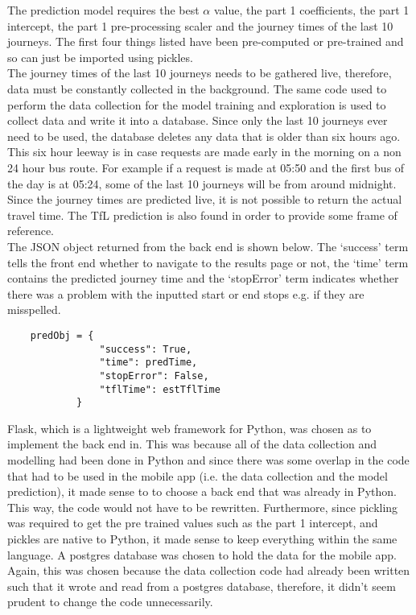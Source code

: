 The prediction model requires the best $\alpha$ value, the part 1 coefficients, the part 1 intercept, the part 1 pre-processing scaler and the journey times of the last 10 journeys. The first four things listed have been pre-computed or pre-trained and so can just be imported using pickles.\\ 

The journey times of the last 10 journeys needs to be gathered live, therefore, data must be constantly collected in the background. The same code used to perform the data collection for the model training and exploration is used to collect data and write it into a database. Since only the last 10 journeys ever need to be used, the database deletes any data that is older than six hours ago. This six hour leeway is in case requests are made early in the morning on a non 24 hour bus route. For example if a request is made at 05:50 and the first bus of the day is at 05:24, some of the last 10 journeys will be from around midnight. \\

Since the journey times are predicted live, it is not possible to return the actual travel time. The TfL prediction is also found in order to provide some frame of reference. \\

The JSON object returned from the back end is shown below. The `success' term tells the front end whether to navigate to the results page or not, the `time' term contains the predicted journey time and the `stopError' term indicates whether there was a problem with the inputted start or end stops e.g. if they are misspelled.

\begin{lstlisting}
    predObj = {
                "success": True,
                "time": predTime,
                "stopError": False,
                "tflTime": estTflTime
            }
\end{lstlisting}


Flask, which is a lightweight web framework for Python, was chosen as to implement the back end in. This was because all of the data collection and modelling had been done in Python and since there was some overlap in the code that had to be used in the mobile app (i.e. the data collection and the model prediction), it made sense to to choose a back end that was already in Python. This way, the code would not have to be rewritten. Furthermore, since pickling was required to get the pre trained values such as the part 1 intercept, and pickles are native to Python, it made sense to keep everything within the same language. A postgres database was chosen to hold the data for the mobile app. Again, this was chosen because the data collection code had already been written such that it wrote and read from a postgres database, therefore, it didn't seem prudent to change the code unnecessarily. \\

\clearpage